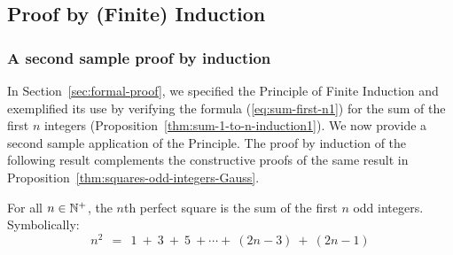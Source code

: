 \subsection{Proof by (Finite) Induction}
\label{sec:Induction}

\subsubsection{A second sample proof by induction}

In Section~\ref{sec:formal-proof}, we specified the Principle of Finite Induction and exemplified its use by verifying the formula (\ref{eq:sum-first-n1}) for the sum of the first $n$ integers
(Proposition~\ref{thm:sum-1-to-n-induction1}).  We now provide a second sample application of the Principle.  The proof by induction of the following result complements the constructive proofs of the same result in Proposition~\ref{thm:squares-odd-integers-Gauss}.

\begin{prop}
\label{thm:squares-odd-integers-induction1}
For all $n \in \mathbb{N}^+$, the $n$th perfect square is the sum of the first $n$ odd integers.  Symbolically:
\[
n^2 \ \ = \ \
1 \ + \ 3 \ + \ 5 \ + \cdots + \ (2n-3) \ + \ (2n-1)
\]
\end{prop}

